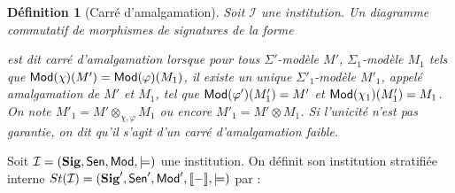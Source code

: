 \documentclass[11pt,a4paper]{article}
\newtheorem{defi}[theo]{Définition}
\newcommand{\ph}{\varphi}
\newcommand{\gr}{\textbf}
\newcommand{\il}{\textit}
\newcommand{\I}{\mathcal{I}}
\newcommand{\lb}{\llbracket}
\newcommand{\rb}{\rrbracket}
\newcommand{\info}[1]{\text{{\fontfamily{lmss}\selectfont #1}}}
\newcommand{\Mod}{\info{Mod}}
\newcommand{\Sen}{\info{Sen}}
\newcommand{\1}{\mathbbm{1}}
\begin{document}
\begin{defi}[Carré d'amalgamation]
Soit $\I$ une institution. Un diagramme commutatif de morphismes de signatures de la forme
\begin{center}
\end{center}
est dit \il{carré d'amalgamation} lorsque pour tous $\Sigma'$-modèle $M'$, $\Sigma_1$-modèle $M_1$ tels que $\Mod(\chi)(M') = \Mod(\ph)(M_1)$, il existe un unique $\Sigma'_1$-modèle $M'_1$, appelé \il{amalgamation} de $M'$ et $M_1$, tel que $\Mod(\ph')(M'_1) = M'$ et $\Mod(\chi_1)(M'_1) = M_1$. On note $M'_1 = M' \otimes_{\chi,\ph} M_1$ ou encore $M'_1 = M' \otimes M_1$. Si l'unicité n'est pas garantie, on dit qu'il s'agit d'un \il{carré d'amalgamation faible}.
\end{defi}
Soit $\I = (\gr{Sig}, \Sen, \Mod, \models)$ une institution. On définit son institution stratifiée interne $St(\I) = (\gr{Sig}', \Sen', \Mod', \lb - \rb, \models)$ par :
\end{document}

